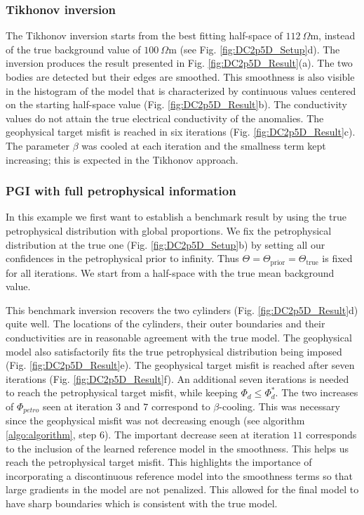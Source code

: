 \documentclass[extra]{gji} %
\begin{document}
\subsubsection{Tikhonov inversion}

The Tikhonov inversion starts from the best fitting half-space of $112~\Omega \text{m}$, instead of the true background value of $100~\Omega \text{m}$ (see Fig. \ref{fig:DC2p5D_Setup}d). The inversion produces the result presented in Fig. \ref{fig:DC2p5D_Result}(a). The two bodies are detected but their edges are smoothed. This smoothness is also visible in the histogram of the model that is characterized by continuous values centered on the starting half-space value (Fig. \ref{fig:DC2p5D_Result}b). The conductivity values do not attain the true electrical conductivity of the anomalies. The geophysical target misfit is reached in six iterations (Fig. \ref{fig:DC2p5D_Result}c). The parameter $\beta$ was cooled at each iteration and the smallness term kept increasing; this is expected in the Tikhonov approach.


\subsubsection{PGI with full petrophysical information}

In this example we first want to establish a benchmark result by using the true petrophysical distribution with global proportions. We fix the petrophysical distribution at the true one (Fig. \ref{fig:DC2p5D_Setup}b) by setting all our confidences in the petrophysical prior to infinity. Thus $\Theta=\Theta_{\text{prior}}=\Theta_{\text{true}}$ is fixed for all iterations. We start from a half-space with the true mean background value.

This benchmark inversion recovers the two cylinders (Fig. \ref{fig:DC2p5D_Result}d) quite well. The locations of the cylinders, their outer boundaries and their conductivities are in reasonable agreement with the true model. The geophysical model also satisfactorily fits the true petrophysical distribution being imposed (Fig. \ref{fig:DC2p5D_Result}e). The geophysical target misfit is reached after seven iterations (Fig. \ref{fig:DC2p5D_Result}f). An additional seven iterations is needed to reach the petrophysical target misfit, while keeping $\Phi_d\leq\Phi_d^*$. The two increases of $\Phi_{petro}$ seen at iteration $3$ and $7$ correspond to $\beta$-cooling.  This was necessary since the geophysical misfit was not decreasing enough (see algorithm \ref{algo:algorithm}, step 6). The important decrease seen at iteration $11$ corresponds to the inclusion of the learned reference model in the smoothness. This helps us reach the petrophysical target misfit. This highlights the importance of incorporating a discontinuous reference model into the smoothness terms so that large gradients in the model are not penalized. This allowed for the final model to have sharp boundaries which is consistent with the true model.
\end{document}
